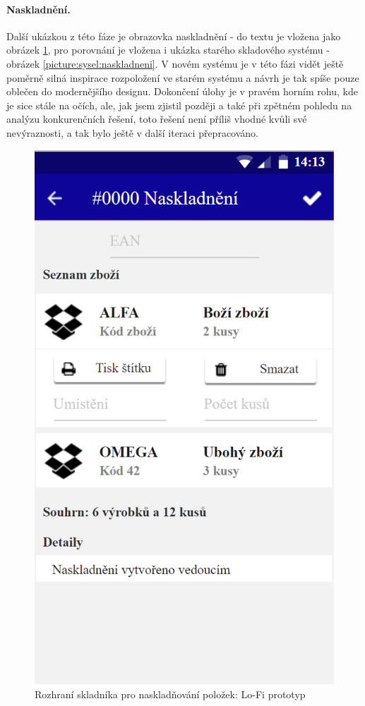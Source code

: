 \paragraph{Naskladnění.} Další ukázkou z této fáze je obrazovka naskladnění - do textu je vložena jako obrázek \ref{picture:axure:naskladneni}, pro porovnání je vložena i ukázka starého skladového systému - obrázek \ref{picture:sysel:naskladneni}. V novém systému je v této fázi vidět ještě poměrně silná inspirace rozpoložení ve starém systému a návrh je tak spíše pouze oblečen do modernějšího designu. Dokončení úlohy je v pravém horním rohu, kde je sice stále na očích, ale, jak jsem zjistil později a také při zpětném pohledu na analýzu konkurenčních řešení, toto řešení není příliš vhodné kvůli své nevýraznosti, a tak bylo ještě v další iteraci přepracováno.\\

\begin{figure}[h]
\includegraphics[height=0.6\textheight]{../png/axure/naskladneni.png}
\caption{Rozhraní skladníka pro naskladňování položek: Lo-Fi prototyp} \label{picture:axure:naskladneni}
\end{figure}

